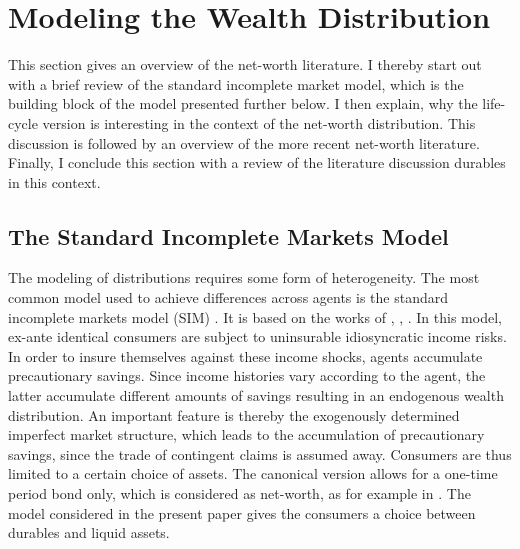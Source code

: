\documentclass[a4paper,12pt,legno]{article}
\begin{document}
\section{Modeling the Wealth Distribution}
This section gives an overview of the net-worth literature. I thereby start out with a brief review of the standard incomplete market model, which is the building block of the model presented further below. I then explain, why the life-cycle version is interesting in the context of the net-worth distribution. This discussion is followed by an overview of the more recent net-worth literature. Finally, I conclude this section with a review of the literature discussion durables in this context. 

\label{Modeling the wealth distribution}
\subsection{The Standard Incomplete Markets Model}
The modeling of distributions requires some form of heterogeneity. The most common model used to achieve differences across agents is the standard incomplete markets model (SIM)   \citep{heathcote2009quantitative}. It is based on the works of \cite{bewley1977permanent}, \cite{aiyagari1994}, \cite{huggett1993risk}. In this model, ex-ante identical consumers are subject to uninsurable idiosyncratic income risks. In order to insure themselves against these income shocks, agents accumulate precautionary savings. Since income histories vary according to the agent, the latter accumulate different amounts of savings resulting in an endogenous wealth distribution. An important feature is thereby the exogenously determined imperfect market structure, which leads to the accumulation of precautionary savings, since the trade of contingent claims is assumed away. Consumers are thus limited to a certain choice of assets. The canonical version allows for a one-time period bond only, which is considered as net-worth, as for example in \cite{hintermaier2011}. The model considered in the present paper gives the consumers a choice between durables and liquid assets. 
\end{document}
